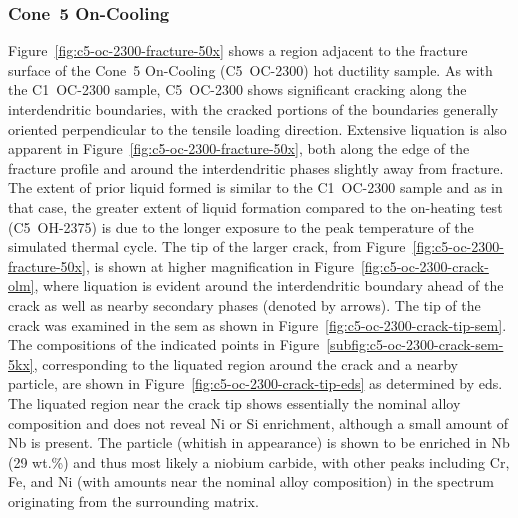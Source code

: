 {\subsubsection{Cone~5 On-Cooling}
Figure~\ref{fig:c5-oc-2300-fracture-50x} shows a region adjacent to the fracture surface of the Cone~5 On-Cooling  (C5~OC-2300) hot ductility sample. As with the C1~OC-2300 sample, C5~OC-2300 shows significant cracking along the interdendritic boundaries, with the cracked portions of the boundaries generally oriented perpendicular to the tensile loading direction. Extensive liquation is also apparent in Figure~\ref{fig:c5-oc-2300-fracture-50x}, both along the edge of the fracture profile and around the interdendritic phases slightly away from fracture. The extent of prior liquid formed is similar to the C1~OC-2300 sample and as in that case, the greater extent of liquid formation compared to the on-heating test (C5~OH-2375) is due to the longer exposure to the peak temperature of the simulated thermal cycle. The tip of the larger crack, from Figure~\ref{fig:c5-oc-2300-fracture-50x}, is shown at higher magnification in Figure~\ref{fig:c5-oc-2300-crack-olm}, where liquation is evident around the interdendritic boundary ahead of the crack as well as nearby secondary phases (denoted by arrows). The tip of the crack was examined in the \gls{sem} as shown in Figure~\ref{fig:c5-oc-2300-crack-tip-sem}. The compositions of the indicated points in Figure~\ref{subfig:c5-oc-2300-crack-sem-5kx}, corresponding to the liquated region around the crack and a nearby particle, are shown in Figure~\ref{fig:c5-oc-2300-crack-tip-eds} as determined by \gls{eds}. The liquated region near the crack tip shows essentially the nominal alloy composition and does not reveal Ni or Si enrichment, although a small amount of Nb is present. The particle (whitish in appearance) is shown to be enriched in Nb (29 wt.\%) and thus most likely a niobium carbide, with other peaks including Cr, Fe, and Ni (with amounts near the nominal alloy composition) in the spectrum originating from the surrounding matrix.

}
